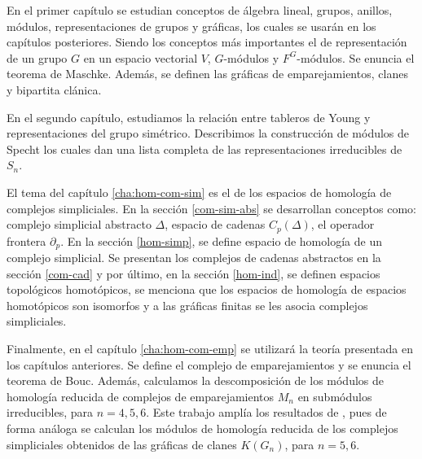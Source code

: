 \documentclass[12pt]{book}
\theoremstyle{definition}
\newcounter{in}
\newcounter{ini}
\begin{document}



En el primer capítulo se estudian conceptos de álgebra lineal, grupos,
anillos, módulos, representaciones de grupos y gráficas, los cuales se
usarán en los capítulos posteriores. Siendo los conceptos más
importantes el de representación de un grupo $G$ en un espacio
vectorial $V$, $G$-módulos y $F^{G}$-módulos. Se enuncia el teorema de
Maschke. Además, se definen las gráficas de emparejamientos, clanes y
bipartita clánica.

En el segundo capítulo, estudiamos la relación entre tableros de Young
y representaciones del grupo simétrico. Describimos la construcción de
módulos de Specht los cuales dan una lista completa de las
representaciones irreducibles de $S_{n}$.

El tema del capítulo \ref{cha:hom-com-sim} es el de los espacios de homología de complejos simpliciales.
En la sección \ref{com-sim-abs} se desarrollan conceptos como:
complejo simplicial abstracto $\Delta$, espacio de cadenas $C_{p}(\Delta)$, el
operador frontera $\partial_{p}$. En la sección \ref{hom-simp}, se
define espacio de homología de un complejo simplicial. Se
presentan los complejos de cadenas abstractos en la sección \ref{com-cad} y por
último, en la sección \ref{hom-ind}, se definen espacios topológicos
homotópicos, se menciona que los espacios de homología de espacios homotópicos son
isomorfos y a las gráficas finitas se les asocia complejos simpliciales.

Finalmente, en el capítulo \ref{cha:hom-com-emp} se utilizará la teoría presentada en los
capítulos anteriores. Se define el complejo de emparejamientos y se
enuncia el teorema de Bouc.  Además, calculamos la descomposición de
los módulos de homología reducida de complejos de emparejamientos $M_{n}$ en
submódulos irreducibles, para $n=4,5,6$. Este trabajo amplía los resultados de \cite{robles08:_repres}, pues de
forma análoga se calculan los módulos de homología reducida de los complejos
simpliciales obtenidos de las gráficas de clanes $K(G_{n})$, para
$n=5,6$.
\end{document}
